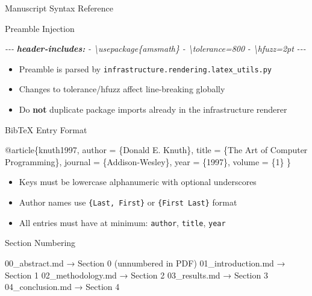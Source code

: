 \documentclass[
  ignorenonframetext,
]{beamer}
\newenvironment{Shaded}{}{}
\newcommand{\AnnotationTok}[1]{\textcolor[rgb]{0.38,0.63,0.69}{\textbf{\textit{#1}}}}
\newcommand{\CommentTok}[1]{\textcolor[rgb]{0.38,0.63,0.69}{\textit{#1}}}
\newcommand{\DataTypeTok}[1]{\textcolor[rgb]{0.56,0.13,0.00}{#1}}
\newcommand{\NormalTok}[1]{#1}
\newcommand{\OtherTok}[1]{\textcolor[rgb]{0.00,0.44,0.13}{#1}}
\newcommand{\VariableTok}[1]{\textcolor[rgb]{0.10,0.09,0.49}{#1}}
\providecommand{\tightlist}{%
  \setlength{\itemsep}{0pt}\setlength{\parskip}{0pt}}
\begin{document}
\begin{frame}[fragile]{Manuscript Syntax Reference}
\begin{block}{Preamble Injection}
\begin{Shaded}
\begin{Highlighting}[]
\CommentTok{{-}{-}{-}}
\AnnotationTok{header{-}includes:}
\CommentTok{  {-} \textbackslash{}usepackage\{amsmath\}}
\CommentTok{  {-} \textbackslash{}tolerance=800}
\CommentTok{  {-} \textbackslash{}hfuzz=2pt}
\CommentTok{{-}{-}{-}}
\end{Highlighting}
\end{Shaded}

\begin{itemize}
\tightlist
\item
  Preamble is parsed by
  \texttt{infrastructure.rendering.latex\_utils.py}
\item
  Changes to tolerance/hfuzz affect line-breaking globally
\item
  Do \textbf{not} duplicate package imports already in the
  infrastructure renderer
\end{itemize}
\end{block}

\begin{block}{BibTeX Entry Format}
\protect{}\label{bibtex-entry-format}
\begin{Shaded}
\begin{Highlighting}[]
\VariableTok{@article}\NormalTok{\{}\OtherTok{knuth1997}\NormalTok{,}
  \DataTypeTok{author}\NormalTok{  = \{Donald E. Knuth\},}
  \DataTypeTok{title}\NormalTok{   = \{The Art of Computer Programming\},}
  \DataTypeTok{journal}\NormalTok{ = \{Addison{-}Wesley\},}
  \DataTypeTok{year}\NormalTok{    = \{1997\},}
  \DataTypeTok{volume}\NormalTok{  = \{1\}}
\NormalTok{\}}
\end{Highlighting}
\end{Shaded}

\begin{itemize}
\tightlist
\item
  Keys must be lowercase alphanumeric with optional underscores
\item
  Author names use \texttt{\{Last,\ First\}} or \texttt{\{First\ Last\}}
  format
\item
  All entries must have at minimum: \texttt{author}, \texttt{title},
  \texttt{year}
\end{itemize}
\end{block}

\begin{block}{Section Numbering}
\protect{}\label{section-numbering}
\begin{Shaded}
\begin{Highlighting}[]
\NormalTok{00\_abstract.md    → Section 0 (unnumbered in PDF)}
\NormalTok{01\_introduction.md → Section 1}
\NormalTok{02\_methodology.md  → Section 2}
\NormalTok{03\_results.md      → Section 3}
\NormalTok{04\_conclusion.md   → Section 4}
\end{Highlighting}
\end{Shaded}


\end{block}
\end{frame}
\end{document}
